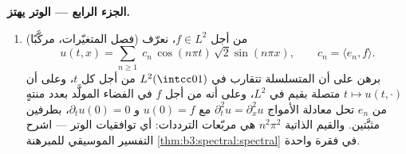 \begin{problem}
\medskip
\noindent\textbf{الجزء الرابع --- الوتر يهتز.}
\begin{enumerate}[resume]
  \item (فصل المتغيّرات، مركَّبًا) من أجل $f \in
        L^2$، نعرّف
        \[
        u(t, x) = \sum_{n\geq1}\;c_n\,
        \cos(n\pi t)\,\sqrt2\sin(n\pi x),
        \qquad c_n = \langle e_n, f\rangle .
        \]
        برهن على أن المتسلسلة تتقارب في $L^2(\intcc01)$ من أجل
        كل $t$، وعلى أن $t\mapsto u(t, \cdot)$ متصلة بقيم في $L^2$، وعلى أنه
        من أجل $f$ في الفضاء المولَّد بعدد منتهٍ من $e_n$ تحل
        معادلة الأمواج $\partial_t^2u =
        \partial_x^2u$ مع $u(0) = f$ و $\partial_tu(0) = 0$،
        بطرفين مثبَّتين. والقيم الذاتية $n^2\pi^2$ هي مربّعات
        الترددات: أي توافقيات الوتر --- اشرح التفسير الموسيقي
        للمبرهنة \cref{thm:b3:spectral:spectral} في فقرة واحدة.
\end{enumerate}


\end{problem}
